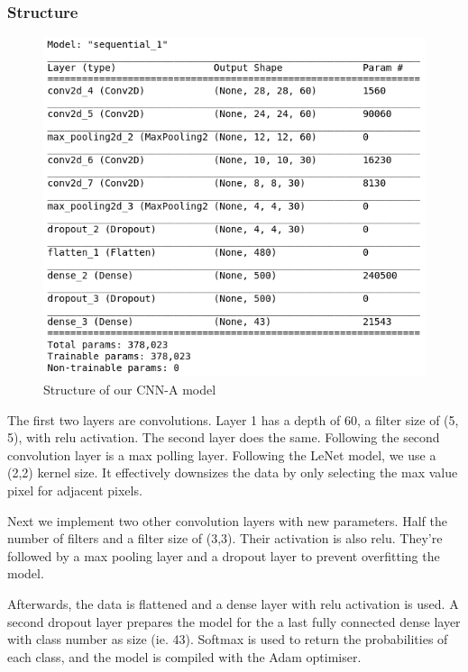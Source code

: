 \documentclass[12pt, landscape]{article}
\begin{document}
\begin{multicols}{3}
\subsubsection{Structure}
\begin{figure}[H]
    \centerline{\includegraphics[scale = 0.5]{model.png}}
    \caption{Structure of our CNN-A model}
    \label{fig:CNNAstructure}
\end{figure}

The first two layers are convolutions. Layer 1 has a depth of 60, a filter size
of (5, 5), with relu activation. The second layer does the same. Following the
second convolution layer is a max polling layer. Following the LeNet model, we
use a (2,2) kernel size. It effectively downsizes the data by only selecting the
max value pixel for adjacent pixels.

Next we implement two other convolution layers with new parameters. Half the
number of filters and a filter size of (3,3). Their activation is also relu.
They're followed by a max pooling layer and a dropout layer to prevent
overfitting the model. 

Afterwards, the data is flattened and a dense layer with relu activation is
used. A second dropout layer prepares the model for the a last fully connected
dense layer with class number as size (ie. 43). Softmax is used to return the
probabilities of each class, and the model is compiled with the Adam optimiser.


\end{multicols}
\end{document}
